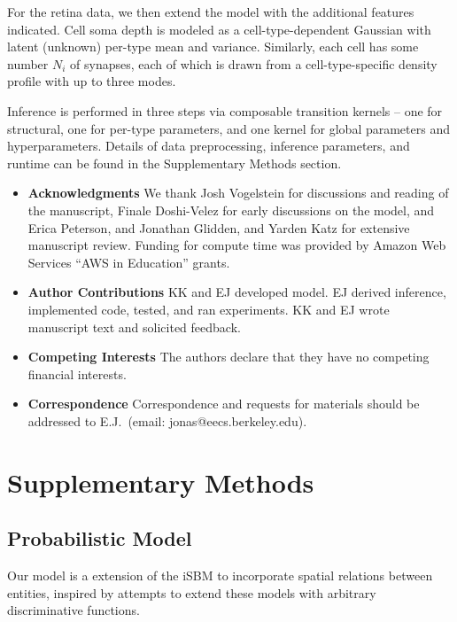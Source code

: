 \documentclass{article}
\begin{document}
{For the retina data, we then extend the model with the additional
features indicated. Cell soma depth is modeled as a
cell-type-dependent Gaussian with latent (unknown) per-type mean and
variance. Similarly, each cell has some number $N_i$ of synapses, 
each of which is drawn from a cell-type-specific density profile
with up to three modes.


Inference is performed in three steps via composable transition 
kernels -- one for structural, one for per-type parameters, and
one kernel for global parameters and hyperparameters. Details
of data preprocessing, inference parameters, and runtime can
be found in the Supplementary Methods section. 

\printbibliography

\begin{itemize}

 \item \textbf{Acknowledgments} We thank Josh Vogelstein for discussions and reading of the manuscript, Finale Doshi-Velez for early discussions on the model, and Erica Peterson, and Jonathan Glidden, and Yarden Katz for extensive manuscript review. Funding for compute time was provided by Amazon Web Services ``AWS in Education'' grants. 
\item \textbf{Author Contributions} KK and EJ developed model. EJ derived inference, implemented code, tested, and ran experiments. KK and EJ wrote manuscript text and solicited feedback. 
 \item \textbf{Competing Interests} The authors declare that they have no
competing financial interests.
 \item \textbf{Correspondence} Correspondence and requests for materials
should be addressed to E.J.~(email: jonas@eecs.berkeley.edu).
\end{itemize}

\newpage
\section*{Supplementary Methods }

\subsection*{Probabilistic Model}

Our model is a extension of the iSBM
\autocite{Kemp2006a,Xu2006} to incorporate spatial relations between entities,
inspired by attempts to extend these models with arbitrary
discriminative functions\autocite{Murphy2012}.

}
\end{document}
